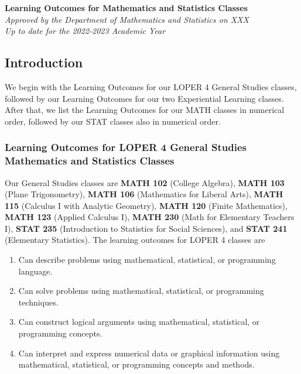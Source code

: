 \documentclass[11pt]{article}
\newenvironment{alphalist}{
\begin{enumerate}[label=(\arabic*),widest=107 ,leftmargin=25pt, itemsep=0pt]}
{\end{enumerate}}
\begin{document}
\begin{flushleft}
    \Large
\textbf{Learning Outcomes for Mathematics and Statistics Classes} \\
\vspace{0.25in}
\normalsize
\emph{Approved by the Department of Mathematics and Statistics on XXX}\\
\emph{Up to date for the 2022-2023 Academic Year}
\end{flushleft}

\subsection*{Introduction}

We begin with the Learning Outcomes for our LOPER  4 General Studies 
classes, followed by our Learning Outcomes for our two Experiential Learning
classes. After that, we list the Learning Outcomes for our MATH classes 
in numerical order, followed by our STAT classes also in numerical order.

\subsubsection*{Learning Outcomes for LOPER  4 General Studies Mathematics and Statistics Classes}

Our General Studies classes are 
\textbf{MATH 102} (College Algebra),
\textbf{MATH 103} (Plane Trigonometry),
\textbf{MATH 106} (Mathematics for Liberal Arts),
\textbf{MATH 115} (Calculus I with Analytic Geometry),
\textbf{MATH 120} (Finite Mathematics),
\textbf{MATH 123} (Applied Calculus I),
\textbf{MATH 230} (Math for Elementary Teachers I),
\textbf{STAT 235} (Introduction to  Statistics for  Social Sciences),
and \textbf{STAT 241}  (Elementary Statistics). The learning outcomes for LOPER  4  classes are

\begin{alphalist}
\item Can describe problems using mathematical, statistical, or programming language.
\item Can solve problems using mathematical, statistical, or programming techniques.
\item Can construct logical arguments using mathematical, statistical, or programming concepts.
\item Can interpret and express numerical data or graphical information using 
   mathematical, statistical, or programming concepts and methods.
\end{alphalist}
\end{document}
